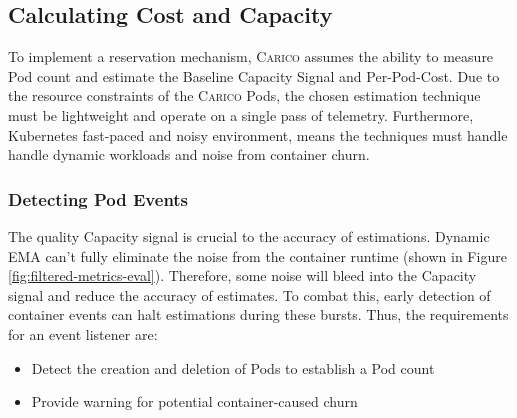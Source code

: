 \subsection{Calculating Cost and Capacity}
To implement a reservation mechanism, \textsc{Carico} assumes the ability to
measure Pod count and estimate the Baseline Capacity Signal and Per-Pod-Cost.
Due to the resource constraints of the \textsc{Carico} Pods, the chosen
estimation technique must be lightweight and operate on a single pass of
telemetry. Furthermore, Kubernetes fast-paced and noisy environment, means the
techniques must handle handle dynamic workloads and noise from container churn.

\subsubsection{Detecting Pod Events}
\label{sec:listeners-comparison}
The quality Capacity signal is crucial to the accuracy of estimations. Dynamic
EMA can't fully eliminate the noise from the container runtime (shown in Figure
\ref{fig:filtered-metrics-eval}). Therefore, some noise will bleed into the
Capacity signal and reduce the accuracy of estimates. To combat this, early
detection of container events can halt estimations during these bursts. Thus,
the requirements for an event listener are:
\begin{itemize}
    \item Detect the creation and deletion of Pods to establish a Pod count
    \item Provide warning for potential container-caused churn
\end{itemize}

